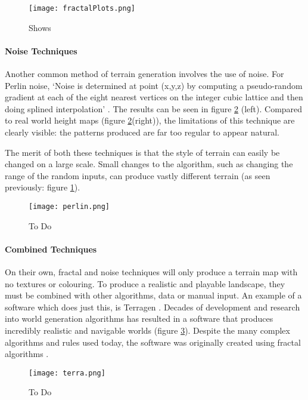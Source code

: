 \documentclass[a4paper]{report}
\begin{document}
\begin{figure}[H]
    \centering
        \texttt{[image: fractalPlots.png]}
        \caption{Shows }
        \label{fig:fractalPlots}
\end{figure}

\paragraph{Noise Techniques}

Another common method of terrain generation involves the use of noise. For Perlin noise, `Noise is determined at point (x,y,z) by computing a pseudo-random gradient at each of the eight nearest vertices on the integer cubic lattice and then doing splined interpolation' \cite{perlinN}. The results can be seen in figure \ref{fig:perlin} (left). Compared to real world height maps (figure \ref{fig:perlin}(right)), the limitations of this technique are clearly visible: the patterns produced are far too regular to appear natural.

The merit of both these techniques is that the style of terrain can easily be changed on a large scale. Small changes to the algorithm, such as changing the range of the random inputs, can produce vastly different terrain (as seen previously: figure \ref{fig:fractalPlots}).

\begin{figure}[H]
    \centering
        \texttt{[image: perlin.png]}
        \caption{To Do}
        \label{fig:perlin}
\end{figure}

\paragraph{Combined Techniques}
On their own, fractal and noise techniques will only produce a terrain map with no textures or colouring. To produce a realistic and playable landscape, they must be combined with other algorithms, data or manual input. An example of a software which does just this, is Terragen \cite{terragen}. Decades of development and research into world generation algorithms has resulted in a software that produces incredibly realistic and navigable worlds (figure \ref{fig:terra}). Despite the many complex algorithms and rules used today, the software was originally created using fractal algorithms \cite{Fairc}.


\begin{figure}[H]
    \centering
        \texttt{[image: terra.png]}
        \caption{To Do}
        \label{fig:terra}
\end{figure}
\end{document}
